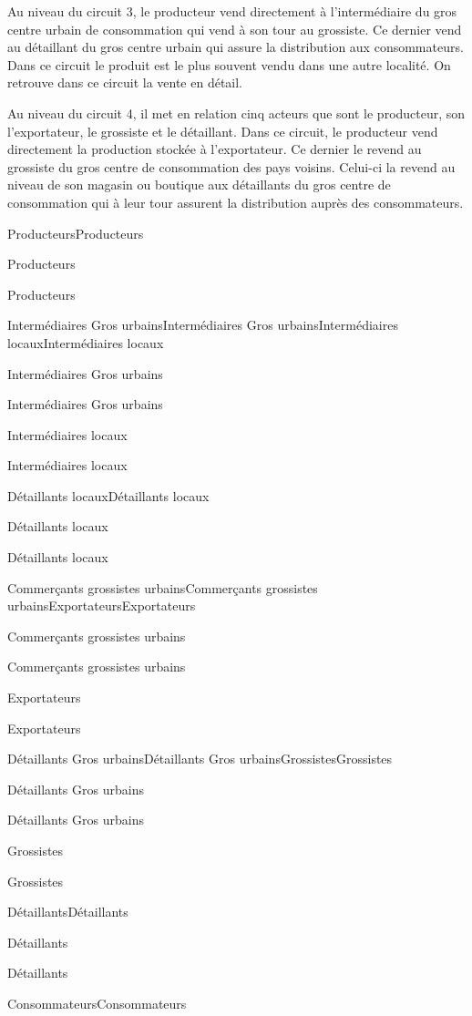 \documentclass[12pt,oneside]{report}
\begin{document}
Au niveau du circuit 3, le producteur vend directement à l’intermédiaire du gros centre urbain de consommation qui vend à son tour au grossiste. Ce dernier vend au détaillant du gros centre urbain qui assure la distribution aux consommateurs. Dans ce circuit le produit est le plus souvent vendu dans une autre localité. On retrouve dans ce circuit la vente en détail.

Au niveau du circuit 4, il met en relation cinq acteurs que sont le producteur, son l’exportateur, le grossiste et le détaillant. Dans ce circuit, le producteur vend directement la production stockée à l’exportateur. Ce dernier le revend au grossiste du gros centre de consommation des pays voisins. Celui-ci la revend au niveau de son magasin ou boutique aux détaillants du gros centre de consommation qui à leur tour assurent la distribution auprès des consommateurs.

ProducteursProducteurs

Producteurs

Producteurs

Intermédiaires Gros urbainsIntermédiaires Gros urbainsIntermédiaires locauxIntermédiaires locaux

Intermédiaires Gros urbains

Intermédiaires Gros urbains

Intermédiaires locaux

Intermédiaires locaux

Détaillants locauxDétaillants locaux

Détaillants locaux

Détaillants locaux

Commerçants grossistes urbainsCommerçants grossistes urbainsExportateursExportateurs

Commerçants grossistes urbains

Commerçants grossistes urbains

Exportateurs

Exportateurs

Détaillants Gros urbainsDétaillants Gros urbainsGrossistesGrossistes

Détaillants Gros urbains

Détaillants Gros urbains

Grossistes

Grossistes

DétaillantsDétaillants

Détaillants

Détaillants

ConsommateursConsommateurs
\end{document}

